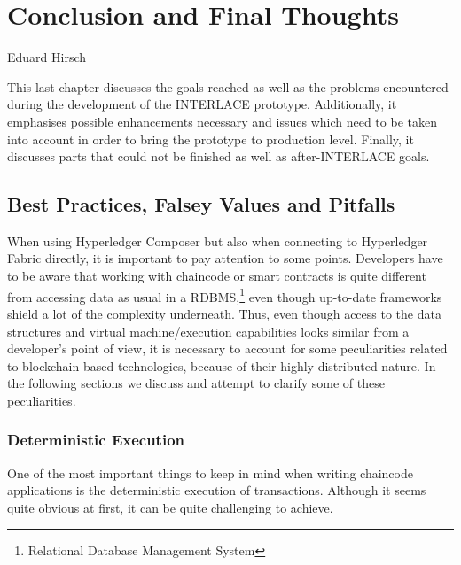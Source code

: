 \chapter{Conclusion and Final Thoughts}
\label{ch:conclusion}

\vspace{-1cm}
\begin{center}
Eduard Hirsch
\end{center}

This last chapter discusses the goals reached as well as the problems encountered during the development of the INTERLACE prototype. Additionally, it emphasises possible enhancements necessary and issues which need to be taken into account in order to bring the prototype to production level. Finally, it discusses parts that could not be finished as well as after-INTERLACE goals.

\section{Best Practices, Falsey Values and Pitfalls}

When using Hyperledger Composer but also when connecting to Hyperledger Fabric directly, it is important to pay attention to some points. Developers have to be aware that working with chaincode or smart contracts is quite different from accessing data as usual in a RDBMS,\footnote{Relational Database Management System} even though up-to-date frameworks shield a lot of the complexity underneath. Thus, even though access to the data structures and virtual machine/execution capabilities looks similar from a developer's point of view, it is necessary to account for some peculiarities related to blockchain-based technologies, because of their highly distributed nature. In the following sections we discuss and attempt to clarify some of these peculiarities.

\subsection{Deterministic Execution}

One of the most important things to keep in mind when writing chaincode applications is the deterministic execution of transactions. Although it seems quite obvious at first, it can be quite challenging to achieve.

